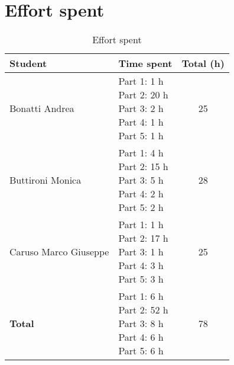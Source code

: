 \chapter{Effort spent}
		\begin{table}[!h]
			\centering
			\begin{tabular}{llc}
				\toprule
					\textbf{Student} & \textbf{Time spent} & \textbf{Total (h)} \\
				\midrule
					Bonatti Andrea & \makecell[l]{ Part 1: 1 h\\ Part 2: 20 h \\ Part 3: 2 h \\ Part 4: 1 h \\ Part 5: 1 h} & 25 \\
					\hline
					Buttironi Monica & \makecell[l]{ Part 1: 4 h \\ Part 2: 15 h \\ Part 3: 5 h \\ Part 4: 2 h \\ Part 5: 2 h} & 28 \\	
					\hline
					Caruso Marco Giuseppe & \makecell[l]{ Part 1: 1 h \\ Part 2: 17 h \\ Part 3: 1 h \\ Part 4: 3 h \\ Part 5: 3 h} & 25 \\
					\hline
					\hline
					\textbf{Total} & \makecell[l]{ Part 1: 6 h\\ Part 2: 52 h \\ Part 3: 8 h \\ Part 4: 6 h \\ Part 5: 6 h} & 78 \\
			\bottomrule	
			\end{tabular}
			\caption{Effort spent}
		\end{table}
	